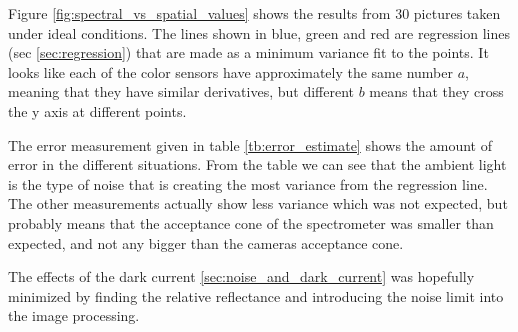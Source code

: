 Figure \ref{fig:spectral_vs_spatial_values} shows the results from 30 pictures taken under ideal conditions. The lines shown in blue, green and red are regression lines (sec \ref{sec:regression}) that are made as a minimum variance fit to the points. It looks like each of the color sensors have approximately the same number $a$, meaning that they have similar derivatives, but different $b$ means that they cross the y axis at different points. 

The error measurement given in table \ref{tb:error_estimate} shows the amount of error in the different situations. From the table we can see that the ambient light is the type of noise that is creating the most variance from the regression line. The other measurements actually show less variance which was not expected, but probably means that the acceptance cone of the spectrometer was smaller than expected, and not any bigger than the cameras acceptance cone. 

The effects of the dark current \ref{sec:noise_and_dark_current} was hopefully minimized by finding the relative reflectance and introducing the noise limit into the image processing. 